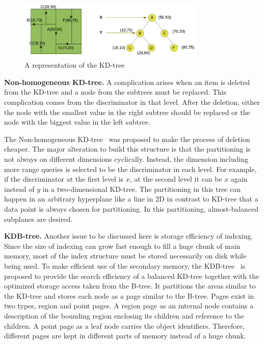 \documentclass[a4paper,12pt]{article}
\begin{document}
\begin{figure}
\centering
\includegraphics[width=0.8\textwidth]{kd-Tree}
\caption{A representation of the KD-tree}
\label{figkdtree}
\end{figure}


\textbf{Non-homogeneous KD-tree.}
A complication arises when an item is deleted from the KD-tree and a node from the subtrees must be replaced. This complication comes from the discriminator in that level. After the deletion, either the node with the smallest value in the right subtree should be replaced or the node with the biggest value in the left subtree. 

The Non-homogeneous KD-tree~\cite{nonhomkdtree} was proposed to make the process of deletion cheaper. The major alteration to build this structure is that the partitioning is not always on different dimensions cyclically. Instead, the dimension including more range queries is selected to be the discriminator in each level. For example, if the discriminator at the first level is $x$, at the second level it can be $x$ again instead of $y$ in a two-dimensional KD-tree. 
The partitioning in this tree can happen in an arbitrary hyperplane like a line in 2D in contrast to KD-tree that a data point is always chosen for partitioning. In this partitioning, almost-balanced subplanes are desired.
 
\textbf{KDB-tree.} Another issue to be discussed here is storage efficiency of indexing.
Since the size of indexing can grow fast enough to fill a huge chunk of main memory, most of the index structure must be stored necessarily on disk while being used.
To make efficient use of the secondary memory, the KDB-tree~\cite{kdbtree} is proposed to provide the search efficiency of a balanced KD-tree together with the optimized storage access taken from the B-tree. It partitions the areas similar to the KD-tree and stores each node as a page similar to the B-tree. Pages exist in two types, 
region and point pages. A region page as an internal node contains a description of the bounding region enclosing its children and reference to the children. 
A point page as a leaf node carries the object identifiers. Therefore, different pages are kept in different parts of memory instead of a huge chunk. 
\end{document}
